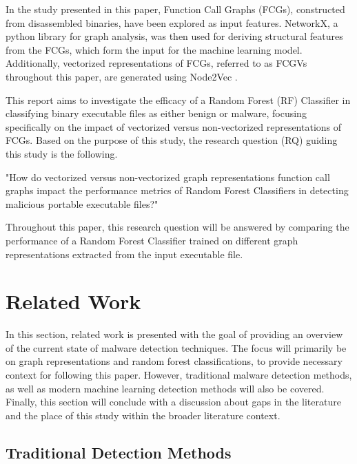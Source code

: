 \documentclass[11pt]{article}
\begin{document}
In the study presented in this paper, Function Call Graphs (FCGs), constructed from disassembled binaries, have been explored as input features. NetworkX, a python library for graph analysis, was then used for deriving structural features from the FCGs, which form the input for the machine learning model. Additionally, vectorized representations of FCGs, referred to as FCGVs throughout this paper, are generated using Node2Vec \cite{grover2016node2vecscalablefeaturelearning}.

This report aims to investigate the efficacy of a Random Forest (RF) Classifier in classifying binary executable files as either benign or malware, focusing specifically on the impact of vectorized versus non-vectorized representations of FCGs. Based on the purpose of this study, the research question (RQ) guiding this study is the following.

\begin{center}
    "How do vectorized versus non-vectorized graph representations function call graphs impact the performance metrics of Random Forest Classifiers in detecting malicious portable executable files?"
\end{center}

Throughout this paper, this research question will be answered by comparing the performance of a Random Forest Classifier trained on different graph representations extracted from the input executable file. 

\section{Related Work}
In this section, related work is presented with the goal of providing an overview of the current state of malware detection techniques. The focus will primarily be on graph representations and random forest classifications, to provide necessary context for following this paper. However, traditional malware detection methods, as well as modern machine learning detection methods will also be covered. Finally, this section will conclude with a discussion about gaps in the literature and the place of this study within the broader literature context.

\subsection{Traditional Detection Methods}
\end{document}
